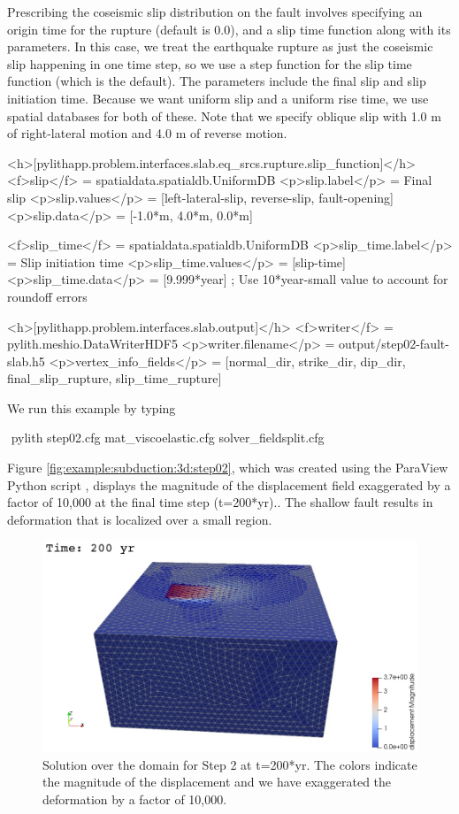 Prescribing the coseismic slip distribution on the fault involves
specifying an origin time for the rupture (default is 0.0), and a slip
time function along with its
parameters. In this case, we treat the earthquake rupture as just the
coseismic slip happening in one time step, so we use a step function
for the slip time function (which is the default). The parameters
include the final slip and slip initiation time. Because we want
uniform slip and a uniform rise time, we use 
spatial databases for both of these. Note that we specify oblique slip
with 1.0 m of right-lateral motion and 4.0 m of reverse motion.
\begin{cfg}
<h>[pylithapp.problem.interfaces.slab.eq_srcs.rupture.slip_function]</h>
<f>slip</f> = spatialdata.spatialdb.UniformDB
<p>slip.label</p> = Final slip
<p>slip.values</p> = [left-lateral-slip, reverse-slip, fault-opening]
<p>slip.data</p> = [-1.0*m, 4.0*m, 0.0*m] 

<f>slip_time</f> = spatialdata.spatialdb.UniformDB
<p>slip_time.label</p>  = Slip initiation time
<p>slip_time.values</p> = [slip-time]
<p>slip_time.data</p> = [9.999*year] ; Use 10*year-small value to account for roundoff errors

<h>[pylithapp.problem.interfaces.slab.output]</h>
<f>writer</f> = pylith.meshio.DataWriterHDF5
<p>writer.filename</p> = output/step02-fault-slab.h5
<p>vertex_info_fields</p> = [normal_dir, strike_dir, dip_dir, final_slip_rupture, slip_time_rupture]
\end{cfg}

We run this example by typing
\begin{shell}
$$ pylith step02.cfg mat_viscoelastic.cfg solver_fieldsplit.cfg
\end{shell}

Figure \vref{fig:example:subduction:3d:step02}, which was created
using the ParaView Python script ,
displays the magnitude of the displacement field exaggerated by a
factor of 10,000 at the final time step (t=200*yr)..  The shallow
fault results in deformation that is localized over a small region.

\begin{figure}
  \includegraphics[width=5.0in]{examples/figs/subduction3d_step02_soln}
  \caption{Solution over the domain for Step 2 at t=200*yr. The colors indicate
    the magnitude of the displacement and we have exaggerated the
    deformation by a factor of 10,000.}
  \label{fig:example:subduction:3d:step02}
\end{figure}


